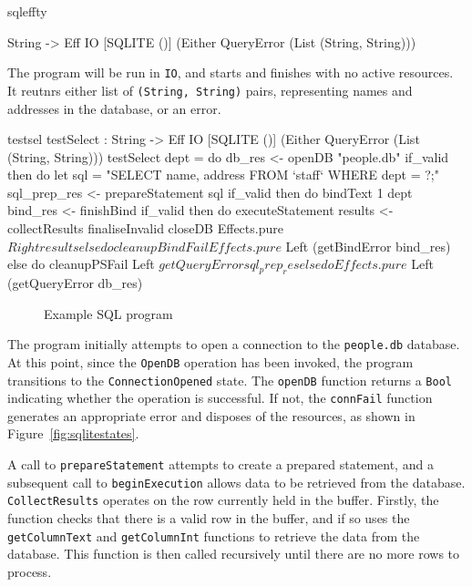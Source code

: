 \noindent
\begin{SaveVerbatim}{sqleffty}

String -> Eff IO [SQLITE ()] 
           (Either QueryError (List (String, String)))

\end{SaveVerbatim}

\noindent
The program will be run in \texttt{IO}, and starts and finishes with no active
resources.  It reutnrs either list of \texttt{(String, String)} pairs,
representing names and addresses in the database, or an error.

\begin{SaveVerbatim}{testsel}
testSelect : String -> Eff IO [SQLITE ()] 
             (Either QueryError (List (String, String)))
testSelect dept = do
  db_res <- openDB "people.db"
  if_valid then do
    let sql = "SELECT name, address FROM `staff` 
                    WHERE dept = ?;"
    sql_prep_res <- prepareStatement sql
    if_valid then do 
      bindText 1 dept
      bind_res <- finishBind
      if_valid then do
        executeStatement
        results <- collectResults
        finaliseInvalid
        closeDB
        Effects.pure $ Right results
      else do
        cleanupBindFail
        Effects.pure $ Left (getBindError bind_res)
    else do
      cleanupPSFail
      Left $ getQueryError sql_prep_res
  else do 
    Effects.pure $ Left (getQueryError db_res)
\end{SaveVerbatim}

\begin{figure}[h]
\caption{Example SQL program}
\label{fig:testsel}
\end{figure}

The program initially attempts to open a connection to the \texttt{people.db}
database. At this point, since the \texttt{OpenDB} operation has been invoked,
the program transitions to the \texttt{ConnectionOpened} state. The
\texttt{openDB} function returns a \texttt{Bool} indicating whether the
operation is successful. If not, the \texttt{connFail} function
generates an appropriate error and disposes of the resources, as shown in
Figure~\ref{fig:sqlitestates}.

A call to \texttt{prepareStatement} attempts to create a prepared statement,
and a subsequent call to \texttt{beginExecution} allows data to be retrieved
from the database.
%
\texttt{CollectResults} operates on the row currently held in the buffer.
Firstly, the function checks
that there is a valid row in the buffer, and if so uses the
\texttt{getColumnText} and \texttt{getColumnInt} functions to retrieve the data
from the database. This function is then called recursively until there are no
more rows to process.

